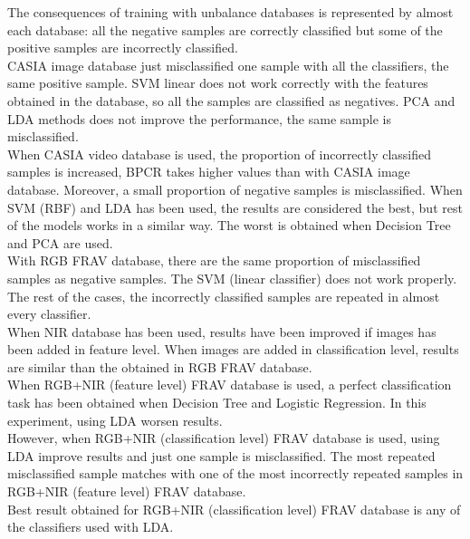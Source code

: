 The consequences of training with unbalance databases is represented by almost each database: all the negative samples are correctly classified but some of the positive samples are incorrectly classified.\\

CASIA image database just misclassified one sample with all the classifiers, the same positive sample. SVM linear does not work correctly with the features obtained in the database, so all the samples are classified as negatives. PCA and LDA methods does not improve the performance, the same sample is misclassified.\\

When CASIA video database is used, the proportion of incorrectly classified samples is increased, BPCR takes higher values than with CASIA image database. Moreover, a small proportion of negative samples is misclassified. When SVM (RBF) and LDA has been used, the results are considered the best, but rest of the models works in a similar way. The worst is obtained when Decision Tree and PCA are used.\\

With RGB FRAV database, there are the same proportion of misclassified samples as negative samples. The SVM (linear classifier) does not work properly. The rest of the cases, the incorrectly classified samples are repeated in almost every classifier.\\

When NIR database has been used, results have been improved if images has been added in feature level. When images are added in classification level, results are similar than the obtained in RGB FRAV database.\\

When RGB+NIR (feature level) FRAV database is used, a perfect classification task has been obtained when Decision Tree and Logistic Regression. In this experiment, using LDA worsen results.\\

However, when RGB+NIR (classification level) FRAV database is used, using LDA improve results and just one sample is misclassified. The most repeated misclassified sample matches with one of the most incorrectly repeated samples in RGB+NIR (feature level) FRAV database.\\

Best result obtained for RGB+NIR (classification level) FRAV database is any of the classifiers used with LDA.\\

